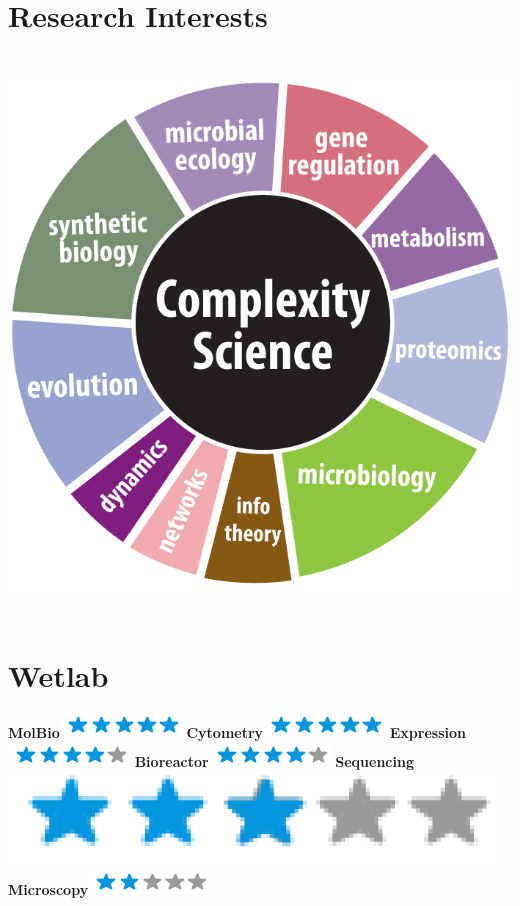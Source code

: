 \documentclass[]{friggeri-cv}
\begin{document}
\begin{aside}
~
~
~
~
~
~
~
\section{Research Interests}
     ~
    \includegraphics[scale=0.6]{img/interests.png}
    ~
\section{Wetlab}
    \textbf{MolBio}\includegraphics[scale=0.40]{img/5stars.png}
    \textbf{Cytometry}\includegraphics[scale=0.40]{img/5stars.png}
    \textbf{Expression}\includegraphics[scale=0.40]{img/4stars.png}
    \textbf{Bioreactor}\includegraphics[scale=0.40]{img/4stars.png}
    \textbf{Sequencing}\includegraphics[scale=0.40]{img/3stars.png}
    \textbf{Microscopy}\includegraphics[scale=0.40]{img/2stars.png}
    ~

\end{aside}
\end{document}
